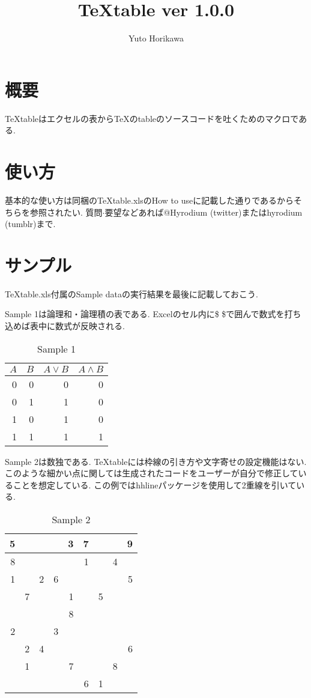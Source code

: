 \documentclass{jsarticle}
\title{\vspace{-4.5zw}TeXtable ver 1.0.0}
\author{Yuto Horikawa}
\begin{document}
\maketitle
\vspace{-3zw}
\section{概要}
TeXtableはエクセルの表からTeXのtableのソースコードを吐くためのマクロである.
\section{使い方}
基本的な使い方は同梱のTeXtable.xlsのHow to useに記載した通りであるからそちらを参照されたい.
質問$\cdot$要望などあれば@Hyrodium (twitter)またはhyrodium (tumblr)まで.
\section{サンプル}
TeXtable.xls付属のSample dataの実行結果を最後に記載しておこう.

Sample 1は論理和・論理積の表である.
Excelのセル内に\$ \$で囲んで数式を打ち込めば表中に数式が反映される.
\begin{table}[htb]
	\caption{Sample 1}
	\label{sample1}
	\centering
	\begin{tabular}{|r|r|r|r|}\hline
		$A$	&$B$	&$A\vee B$	&$A\wedge B$	\\ \hline
		0	&0	&0	&0	\\ \hline
		0	&1	&1	&0	\\ \hline
		1	&0	&1	&0	\\ \hline
		1	&1	&1	&1	\\ \hline
	\end{tabular}
\end{table}

Sample 2は数独である.
TeXtableには枠線の引き方や文字寄せの設定機能はない.
このような細かい点に関しては生成されたコードをユーザーが自分で修正していることを想定している.
この例ではhhlineパッケージを使用して2重線を引いている.

\begin{table}[htb]
	\caption{Sample 2}
	\label{sample2}
	\centering
	\begin{tabular}{|r|r|r||r|r|r||r|r|r|}\hline
		5	&	&	&	&3	&7	&	&	&9	\\ \hline
		8	&	&	&	&	&1	&	&4	&	\\ \hline
		1	&	&2	&6	&	&	&	&	&5	\\ \hhline{|=|=|=#=|=|=#=|=|=|}
			&7	&	&	&1	&	&5	&	&	\\ \hline
			&	&	&	&8	&	&	&	&	\\ \hline
		2	&	&	&3	&	&	&	&	&	\\ \hhline{|=|=|=#=|=|=#=|=|=|}
			&2	&4	&	&	&	&	&	&6	\\ \hline
			&1	&	&	&7	&	&	&8	&	\\ \hline
			&	&	&	&	&6	&1	&	&	\\ \hline
	\end{tabular}
\end{table}
\end{document}
